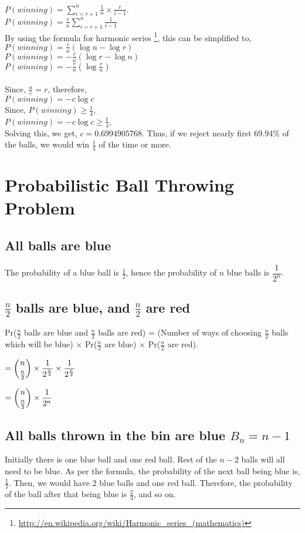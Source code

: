 \documentclass{article}
\begin{document}
\\
$P(winning) = \displaystyle\sum\limits_{i=r+1}^n \frac{1}{n} \times \frac{r}{i-1}$.\\
$P(winning) = \frac{r}{n} \displaystyle\sum\limits_{i=r+1}^n \frac{1}{i-1}$\\
By using the formula for harmonic series \footnote{\url{http://en.wikipedia.org/wiki/Harmonic_series_(mathematics)}}, 
this can be simplified to,\\
$P(winning) = \frac{r}{n} (\log{n} - \log{r})$\\
$P(winning) = -\frac{r}{n} (\log{r} - \log{n})$\\
$P(winning) = -\frac{r}{n}(\log{\frac{r}{n}})$\\
\\
Since, $\frac{n}{c} = r$, therefore,\\
$P(winning) = - c \log{c}$\\
Since, $P(winning) \geq \frac{1}{4}$,\\
$P(winning) = - c \log{c} \geq \frac{1}{4}$,\\
Solving this, we get, $c = 0.6994905768$. Thus, if we reject nearly first 69.94\% of the balls,
we would win $\frac{1}{4}$ of the time or more.
\clearpage

\section{Probabilistic Ball Throwing Problem}
\subsection{All balls are blue}
The probability of a blue ball is $\frac{1}{2}$, hence the probability of
$n$ blue balls is $\dfrac{1}{2^n}$.

\subsection{$\frac{n}{2}$ balls are blue, and $\frac{n}{2}$ are red}
Pr($\frac{n}{2}$ balls are blue and $\frac{n}{2}$ balls are red) = (Number of ways of choosing $\frac{n}{2}$
balls which will be blue) $\times$ Pr($\frac{n}{2}$ are blue) $\times$
Pr($\frac{n}{2}$ are red).

$= \dbinom{n}{\frac{n}{2}} \times \dfrac{1}{2^{\frac{n}{2}}} \times \dfrac{1}{2^{\frac{n}{2}}}$

$= \dbinom{n}{\frac{n}{2}} \times \dfrac{1}{2^{n}}$

\subsection{All balls thrown in the bin are blue $B_{n} = n-1$}
Initially there is one blue ball and one red ball. Rest of the $n-2$ balls will
all need to be blue. As per the formula, the probability of the next ball 
being blue is, $\frac{1}{2}$. Then, we would have 2 blue balls and one red ball.
Therefore, the probability of the ball after that being blue is $\frac{2}{3}$,
and so on.
\end{document}
